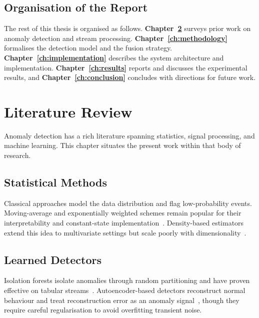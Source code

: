 \documentclass[12pt,a4paper,oneside]{report}
\begin{document}
\section{Organisation of the Report}
\label{sec:organisation}
The rest of this thesis is organised as follows.
\textbf{Chapter~\ref{ch:literature}} surveys prior work on anomaly detection
and stream processing. \textbf{Chapter~\ref{ch:methodology}} formalises the
detection model and the fusion strategy. \textbf{Chapter~\ref{ch:implementation}}
describes the system architecture and implementation.
\textbf{Chapter~\ref{ch:results}} reports and discusses the experimental
results, and \textbf{Chapter~\ref{ch:conclusion}} concludes with directions
for future work.

\chapter{Literature Review}
\label{ch:literature}

Anomaly detection has a rich literature spanning statistics, signal
processing, and machine learning. This chapter situates the present work
within that body of research.

\section{Statistical Methods}
\label{sec:lit-statistical}
Classical approaches model the data distribution and flag low-probability
events. Moving-average and exponentially weighted schemes remain popular for
their interpretability and constant-state implementation~\cite{chandola2009anomaly}.
Density-based estimators extend this idea to multivariate settings but scale
poorly with dimensionality~\cite{breunig2000lof}.

\section{Learned Detectors}
\label{sec:lit-learned}
Isolation forests isolate anomalies through random partitioning and have
proven effective on tabular streams~\cite{liu2008isolation}. Autoencoder-based
detectors reconstruct normal behaviour and treat reconstruction error as an
anomaly signal~\cite{malhotra2016lstm}, though they require careful
regularisation to avoid overfitting transient noise.
\end{document}
